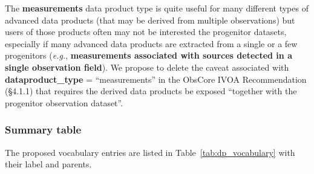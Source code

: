 \documentclass[11pt,a4paper]{ivoa}
\begin{document}
The {\bf measurements} data product type is quite useful for many different types of advanced data products (that may be derived from multiple observations) but users of those products often may not be interested the progenitor datasets, especially if many advanced data products are extracted from a single or a few progenitors ({\em e.g.\/}, {\bf measurements associated with sources detected in a single observation field}). We propose to delete the caveat associated with {\bf dataproduct\_type} = ``measurements'' in the ObsCore IVOA Recommendation (\S4.1.1) that requires the derived data products be exposed ``together with the progenitor observation dataset''.

\newpage
\subsubsection{Summary table}

The proposed vocabulary entries are listed in Table~\ref{tab:dp_vocabulary} with their label and parents.
\end{document}
